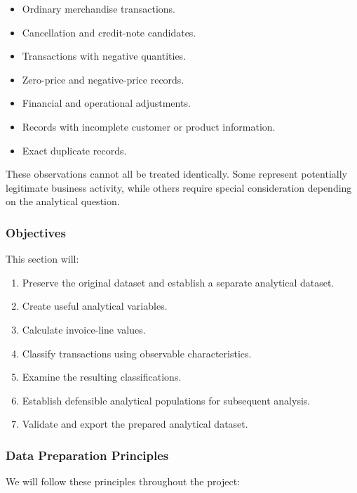 \documentclass[11pt]{article}
\providecommand{\tightlist}{%
      \setlength{\itemsep}{0pt}\setlength{\parskip}{0pt}}
\begin{document}
\begin{itemize}
\tightlist
\item
  Ordinary merchandise transactions.
\item
  Cancellation and credit-note candidates.
\item
  Transactions with negative quantities.
\item
  Zero-price and negative-price records.
\item
  Financial and operational adjustments.
\item
  Records with incomplete customer or product information.
\item
  Exact duplicate records.
\end{itemize}

These observations cannot all be treated identically. Some represent
potentially legitimate business activity, while others require special
consideration depending on the analytical question.

\subsubsection{Objectives}\label{objectives}

This section will:

\begin{enumerate}
\def\labelenumi{\arabic{enumi}.}
\tightlist
\item
  Preserve the original dataset and establish a separate analytical
  dataset.
\item
  Create useful analytical variables.
\item
  Calculate invoice-line values.
\item
  Classify transactions using observable characteristics.
\item
  Examine the resulting classifications.
\item
  Establish defensible analytical populations for subsequent analysis.
\item
  Validate and export the prepared analytical dataset.
\end{enumerate}

\subsubsection{Data Preparation
Principles}\label{data-preparation-principles}

We will follow these principles throughout the project:
\end{document}

